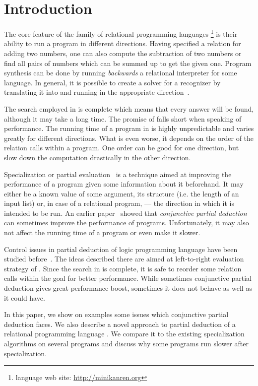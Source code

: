 \section{Introduction}

The core feature of the family of relational programming languages \mk\footnote{\mk language web site: \url{http://minikanren.org}} is their ability to run a program in different directions.
Having specified a relation for adding two numbers, one can also compute the subtraction of two numbers or find all pairs of numbers which can be summed up to get the given one.
Program synthesis can be done by running \emph{backwards} a relational interpreter for some language.
In general, it is possible to create a solver for a recognizer by translating it into \mk and running in the appropriate direction~\cite{lozov2019relational}.

The search employed in \mk is complete which means that every answer will be found, although it may take a long time.
The promise of \mk falls short when speaking of performance.
The running time of a program in \mk is highly unpredictable and varies greatly for different directions.
What is even worse, it depends on the order of the relation calls within a program.
One order can be good for one direction, but slow down the computation drastically in the other direction.

Specialization or partial evaluation~\cite{jonesbook} is a technique aimed at improving the performance of a program given some information about it beforehand.
It may either be a known value of some argument, its structure (i.e. the length of an input list) or, in case of a relational program, --- the direction in which it is intended to be run.
An earlier paper~\cite{lozov2019relational} showed that \emph{conjunctive partial deduction}~\cite{de1999conjunctive} can sometimes improve the performance of \mk programs.
Unfortunately, it may also not affect the running time of a program or even make it slower.

Control issues in partial deduction of logic programming language \pro have been studied before~\cite{leuschel2002logic}.
The ideas described there are aimed at left-to-right evaluation strategy of \pro.
Since the search in \mk is complete, it is safe to reorder some relation calls within the goal for better performance.
While sometimes conjunctive partial deduction gives great performance boost, sometimes it does not behave as well as it could have.

In this paper, we show on examples some issues which conjunctive partial deduction faces.
We also describe a novel approach to partial deduction of a relational programming language \mk.
We compare it to the existing specialization algorithms on several programs and discuss why some \mk programs run slower after specialization.
